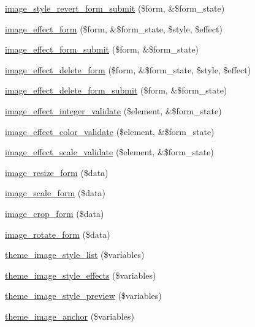 \begin{DoxyCompactItemize}
\item 
\hyperlink{image_8admin_8inc_a359100e93b8033e1bad0ceb548b599c0}{image\_\-style\_\-revert\_\-form\_\-submit} (\$form, \&\$form\_\-state)
\item 
\hyperlink{group__forms_ga0e5c2f6d235007423202fcae209b311b}{image\_\-effect\_\-form} (\$form, \&\$form\_\-state, \$style, \$effect)
\item 
\hyperlink{image_8admin_8inc_aab999018d03bcbfde679bb79edcb4e34}{image\_\-effect\_\-form\_\-submit} (\$form, \&\$form\_\-state)
\item 
\hyperlink{group__forms_ga25884137c6384012e7a7d6cdde5d8afa}{image\_\-effect\_\-delete\_\-form} (\$form, \&\$form\_\-state, \$style, \$effect)
\item 
\hyperlink{image_8admin_8inc_aa77e4be504f72cab81b144a57a377427}{image\_\-effect\_\-delete\_\-form\_\-submit} (\$form, \&\$form\_\-state)
\item 
\hyperlink{image_8admin_8inc_a021d1b2c5b893b7c59098ee07e12cfec}{image\_\-effect\_\-integer\_\-validate} (\$element, \&\$form\_\-state)
\item 
\hyperlink{image_8admin_8inc_a2c063ffc86288da6ffc7ff2aa1fe5248}{image\_\-effect\_\-color\_\-validate} (\$element, \&\$form\_\-state)
\item 
\hyperlink{image_8admin_8inc_ae8049cc30ac262d165f3c1f73b657b0c}{image\_\-effect\_\-scale\_\-validate} (\$element, \&\$form\_\-state)
\item 
\hyperlink{image_8admin_8inc_abe6ab1b2613696b2dc0914c0dc1c8031}{image\_\-resize\_\-form} (\$data)
\item 
\hyperlink{image_8admin_8inc_a0cef54d6978f87588088549e59c18363}{image\_\-scale\_\-form} (\$data)
\item 
\hyperlink{image_8admin_8inc_a9d54a4b791373a6f383894146a8e8d73}{image\_\-crop\_\-form} (\$data)
\item 
\hyperlink{image_8admin_8inc_a639fc7193d6ac3c7377e244beb2d114f}{image\_\-rotate\_\-form} (\$data)
\item 
\hyperlink{group__themeable_gaa215d56002640f64d6fc84311b18c116}{theme\_\-image\_\-style\_\-list} (\$variables)
\item 
\hyperlink{group__themeable_ga1227448c909cd1606cb18928876958f2}{theme\_\-image\_\-style\_\-effects} (\$variables)
\item 
\hyperlink{group__themeable_gadadcabb59ca4f10f98be76d80e224e4a}{theme\_\-image\_\-style\_\-preview} (\$variables)
\item 
\hyperlink{group__themeable_ga87233de46f3d47b3771920125165035d}{theme\_\-image\_\-anchor} (\$variables)

\end{DoxyCompactItemize}

